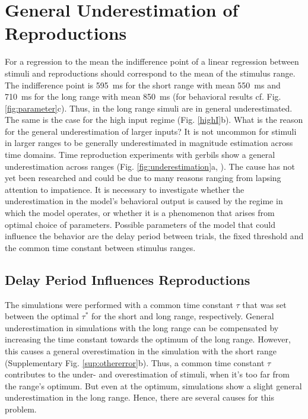 \documentclass[10pt]{article}
\begin{document}
\section{General Underestimation of Reproductions}
For a regression to the mean the indifference point of a linear regression between stimuli and reproductions should correspond to the mean of the stimulus range.
The indifference point is 595~ms for the short range with mean 550~ms and 710~ms for the long range with mean 850~ms (for behavioral results cf. Fig. \ref{fig:parameter}c). Thus, in the long range simuli are in general underestimated. 
The same is the case for the high input regime (Fig. \ref{highI}b).
What is the reason for the general underestimation of larger inputs? 
It is not uncommon for stimuli in larger ranges to be generally underestimated in magnitude estimation across time domains. Time reproduction experiments with gerbils show a general underestimation across ranges (Fig. \ref{fig:underestimation}a, \cite{Henke2022}). 
The cause has not yet been researched and could be due to many reasons ranging from lapsing attention to impatience. 
It is necessary to investigate whether the underestimation in the model's behavioral output is caused by the regime in which the model operates, or whether it is a phenomenon that arises from optimal choice of parameters.
Possible parameters of the model that could influence the behavior are the delay period between trials, the fixed threshold and the common time constant between stimulus ranges.

\subsection{Delay Period Influences Reproductions}
The simulations were performed with a common time constant $\tau$ that was set between the optimal $\tau^*$ for the short and long range, respectively.
General underestimation in simulations with the long range can be compensated by increasing the time constant towards the optimum of the long range. However, this causes a general overestimation in the simulation with the short range (Supplementary Fig. \ref{sup:othererror}b). 
Thus, a common time constant $\tau$ contributes to the under- and overestimation of stimuli, when it's too far from the range's optimum. But even at the optimum, simulations show a slight general underestimation in the long range.
Hence, there are several causes for this problem.
\end{document}

